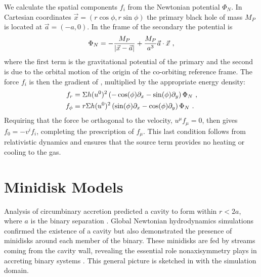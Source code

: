 We calculate the spatial components $f_i$ from the Newtonian potential $\Phi_N$.  In Cartesian coordinates $\vec{x}=(r \cos \phi, r \sin \phi)$ the primary black hole of mass $M_P$ is located at $\vec a = (-a, 0)$.  In the frame of the secondary the potential is
\begin{equation}
	\Phi_N = -\frac{M_P}{|\vec{x} -  \vec{a} |} + \frac{M_P}{a^3}  \vec{a} \cdot \vec{x} \ , \eqlabel{phiN}
\end{equation}
where the first term is the gravitational potential of the primary and the second is due to the orbital motion of the origin of the co-orbiting reference frame.  The force $f_i$ is then the gradient of , multiplied by the appropriate energy density:
\begin{align}
	f_r &= \Sigma h (u^0)^2 \left( -\cos(\phi) \partial_x  - \sin(\phi)\partial_y\right) \Phi_N \ ,\nonumber \\
	f_\phi &= r\Sigma h (u^0)^2 \left( \sin(\phi) \partial_x  -\cos(\phi)\partial_y\right) \Phi_N \ .\nonumber \\
\end{align}
Requiring that the force be orthogonal to the velocity, $u^\mu f_\mu = 0$, then gives $f_0 = -v^i f_i$, completing the prescription of $f_\mu$. This last condition follows from relativistic dynamics and ensures that the source term  provides no heating or cooling to the gas.


\section{Minidisk Models}

Analysis of circumbinary accretion predicted a cavity to form within $r<2a$, where $a$ is the binary separation \citep{Milos05}. Global Newtonian hydrodynamics simulations confirmed the existence of a cavity but also demonstrated the presence of minidisks around each member of the binary.  These minidisks are fed by streams coming from the cavity wall, revealing the essential role nonaxisymmetry plays in accreting binary systems \citep{Farris14}.  This general picture is sketched in  with the simulation domain.

